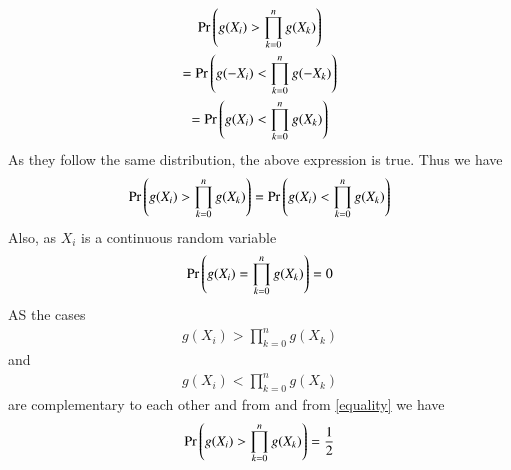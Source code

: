 \documentclass[journal,12pt,twocolumn]{IEEEtran}
\begin{document}
\begin{multline}
    \Pr\left(g(X_i)>\prod_{k=0}^ng(X_k)\right)\\=
    \Pr\left(g(-X_i)<\prod_{k=0}^ng(-X_k)\right)\\=
    \Pr\left(g(X_i)<\prod_{k=0}^ng(X_k)\right)
\end{multline}
As they follow the same distribution, the above expression is true. Thus we have
\begin{align}\label{equality}
    \Pr\left(g(X_i)>\prod_{k=0}^ng(X_k)\right)=
    \Pr\left(g(X_i)<\prod_{k=0}^ng(X_k)\right)
\end{align}
Also, as $X_i$ is a continuous random variable
\begin{align}
    \Pr\left(g(X_i)=\prod_{k=0}^ng(X_k)\right)=0
\end{align}
AS the cases
\begin{align}
    g(X_i)>\prod_{k=0}^ng(X_k)
\end{align}
and
\begin{align}
    {g(X_i)<\prod_{k=0}^ng(X_k)}
\end{align}
are complementary to each other and from 
and from \eqref{equality} we have
\begin{align}\label{prod}
 \Pr\left(g(X_i)>\prod_{k=0}^ng(X_k)\right)=\frac{1}{2}    
\end{align}
\end{document}
